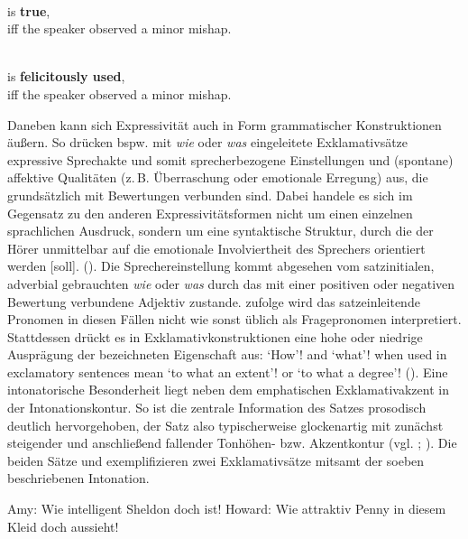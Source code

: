\ea  \label{oops1}
\\
is \textbf{true},\\
iff the speaker observed a minor mishap.
\z

\ea  \label{oops2}
 \\                             
is \textbf{felicitously used},\\
iff the speaker observed a minor mishap. 
\z


Daneben kann sich Expressivität auch in Form grammatischer Konstruktionen äußern. So drücken bspw. mit \textit{wie} oder \textit{was} eingeleitete Exklamativsätze expressive Sprechakte und somit sprecherbezogene Einstellungen und (spontane) affektive Qualitäten (z.\,B. Überraschung oder emotionale Erregung) aus, die grundsätzlich mit Bewertungen verbunden sind. Dabei handele es sich im Gegensatz zu den anderen Expressivitätsformen nicht um einen einzelnen sprachlichen Ausdruck, sondern um eine syntaktische Struktur, durch die \glqq{}der Hörer unmittelbar auf die emotionale Involviertheit des Sprechers orientiert werden [soll].\grqq{} (\citealt[153]{Zifonun.1997}). Die Sprechereinstellung kommt abgesehen vom satzinitialen, adverbial gebrauchten \textit{wie} oder \textit{was} durch das mit einer positiven oder negativen Bewertung verbundene Adjektiv zustande. {\citet[]{Gnutzmann.1975}} zufolge wird das satzeinleitende Pronomen in diesen Fällen nicht wie sonst üblich als Fragepronomen interpretiert. Stattdessen drückt es in Exklamativkonstruktionen eine hohe oder niedrige Ausprägung der bezeichneten Eigenschaft aus: \glqq{}`How'! and `what'! when used in exclamatory sentences mean `to what an extent'! or `to what a degree'!\grqq{} ({\citealt[423]{Gnutzmann.1975}}). Eine intonatorische Besonderheit liegt neben dem emphatischen Exklamativakzent in der Intonationskontur. So ist die zentrale Information des Satzes prosodisch deutlich hervorgehoben, der Satz also typischerweise glockenartig mit zunächst steigender und anschließend fallender Tonhöhen- bzw. Akzentkontur (vgl. \citealt[154]{Zifonun.1997}; \citealt[59,\,121]{Drescher.2003}). Die beiden Sätze  und  exemplifizieren zwei Exklamativsätze mitsamt der soeben beschriebenen Intonation.

 \ea  \label{exklamativ}
 \ea Amy: \glqq{}Wie intelligent Sheldon doch ist!\grqq{}  \label{exklamativ1}
 \ex Howard: \glqq{}Wie attraktiv Penny in diesem Kleid doch aussieht!\grqq{} \label{exklamativ2}
 \z
  \z


